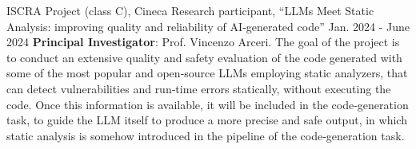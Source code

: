 

\begin{cventries}
  \cventry
  {ISCRA Project (class C), Cineca}
  {Research participant, \textquotedblleft{LLMs Meet Static Analysis:
  improving quality and reliability of AI‑generated code}\textquotedblright}
  {}
  {Jan. 2024 - June 2024}
  { \textbf{Principal Investigator}: Prof. Vincenzo Arceri. The goal
    of the project is to conduct an extensive quality and safety
    evaluation of the code generated with some of the most popular and
    open‑source LLMs employing static analyzers, that can detect
    vulnerabilities and run‑time errors statically, without executing
    the code. Once this information is available, it will be included
    in the code‑generation task, to guide the LLM itself to produce a
    more precise and safe output, in which static analysis is somehow
  introduced in the pipeline of the code‑generation task. }

\end{cventries}
